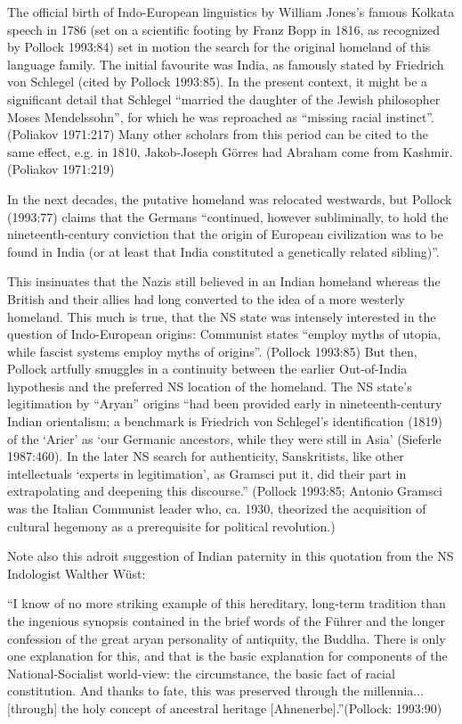 The official birth of Indo-European linguistics by William Jones’s famous Kolkata speech in 1786 (set on a scientific footing by Franz Bopp in 1816, as recognized by Pollock 1993:84) set in motion the search for the original homeland of this language family. The initial favourite was India, as famously stated by Friedrich von Schlegel (cited by Pollock 1993:85). In the present context, it might be a significant detail that Schlegel “married the daughter of the Jewish philosopher Moses Mendelssohn”, for which he was reproached as “missing racial instinct”. (Poliakov 1971:217) Many other scholars from this period can be cited to the same effect, e.g. in 1810, Jakob-Joseph Görres had Abraham come from Kashmir. (Poliakov 1971:219)

In the next decades, the putative homeland was relocated westwards, but Pollock (1993:77) claims that the Germans “continued, however subliminally, to hold the nineteenth-century conviction that the origin of European civilization was to be found in India (or at least that India constituted a genetically related sibling)”. 

This insinuates that the Nazis still believed in an Indian homeland whereas the British and their allies had long converted to the idea of a more westerly homeland. This much is true, that the NS state was intensely interested in the question of Indo-European origins: Communist states “employ myths of utopia, while fascist systems employ myths of origins”. (Pollock 1993:85) But then, Pollock artfully smuggles in a continuity between the earlier Out-of-India hypothesis and the preferred NS location of the homeland. The NS state’s legitimation by “Aryan” origins “had been provided early in nineteenth-century Indian orientalism; a benchmark is Friedrich von Schlegel's identification (1819) of the ‘Arier’ as ‘our Germanic ancestors, while they were still in Asia’ (Sieferle 1987:460). In the later NS search for authenticity, Sanskritists, like other intellectuals ‘experts in legitimation’, as Gramsci put it, did their part in extrapolating and deepening this discourse.” (Pollock 1993:85; Antonio Gramsci was the Italian Communist leader who, ca. 1930, theorized the acquisition of cultural hegemony as a prerequisite for political revolution.)

Note also this adroit suggestion of Indian paternity in this quotation from the NS Indologist Walther Wüst: 
\begin{myquote}
“I know of no more striking example of this hereditary, long-term tradition than the ingenious synopsis contained in the brief words of the Führer and the longer confession of the great aryan personality of antiquity, the Buddha. There is only one explanation for this, and that is the basic explanation for components of the National-Socialist world-view: the circumstance, the basic fact of racial constitution. And thanks to fate, this was preserved through the millennia$\ldots$ [through] the holy concept of ancestral heritage [Ahnenerbe].”\hfill (Pollock: 1993:90)
\end{myquote}

